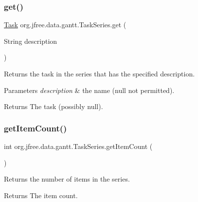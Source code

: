 \subsubsection{\texorpdfstring{get()}{get()}\hspace{0.1cm}{\footnotesize\ttfamily [2/2]}}
{\footnotesize\ttfamily \mbox{\hyperlink{classorg_1_1jfree_1_1data_1_1gantt_1_1_task}{Task}} org.\+jfree.\+data.\+gantt.\+Task\+Series.\+get (\begin{DoxyParamCaption}\item[{String}]{description }\end{DoxyParamCaption})}

Returns the task in the series that has the specified description.


\begin{DoxyParams}{Parameters}
{\em description} & the name ({\ttfamily null} not permitted).\\
\hline
\end{DoxyParams}
\begin{DoxyReturn}{Returns}
The task (possibly {\ttfamily null}). 
\end{DoxyReturn}
\mbox{\label{classorg_1_1jfree_1_1data_1_1gantt_1_1_task_series_a945c8e01970738e46ef5b146f9a643b7}} 
\subsubsection{\texorpdfstring{get\+Item\+Count()}{getItemCount()}}
{\footnotesize\ttfamily int org.\+jfree.\+data.\+gantt.\+Task\+Series.\+get\+Item\+Count (\begin{DoxyParamCaption}{ }\end{DoxyParamCaption})}

Returns the number of items in the series.

\begin{DoxyReturn}{Returns}
The item count. 
\end{DoxyReturn}
\mbox{\label{classorg_1_1jfree_1_1data_1_1gantt_1_1_task_series_a279591f041f643f647030eb7a016b157}} 
